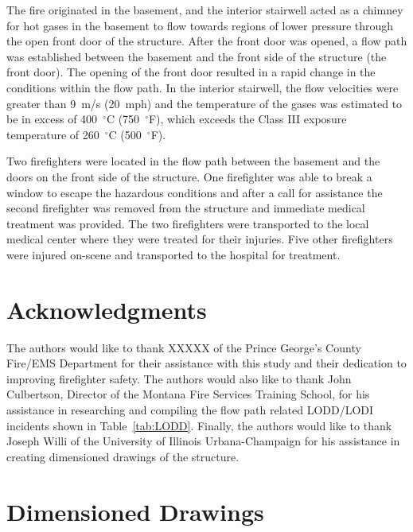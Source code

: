 \documentclass[12pt,oneside]{book}
\begin{document}
The fire originated in the basement, and the interior stairwell acted as a chimney for hot gases in the basement to flow towards regions of lower pressure through the open front door of the structure. After the front door was opened, a flow path was established between the basement and the front side of the structure (the front door). The opening of the front door resulted in a rapid change in the conditions within the flow path. In the interior stairwell, the flow velocities were greater than 9~m/s (20~mph) and the temperature of the gases was estimated to be in excess of 400~$^{\circ}$C (750~$^{\circ}$F), which exceeds the Class III exposure temperature of 260~$^{\circ}$C (500~$^{\circ}$F).

Two firefighters were located in the flow path between the basement and the doors on the front side of the structure. One firefighter was able to break a window to escape the hazardous conditions and after a call for assistance the second firefighter was removed from the structure and immediate medical treatment was provided. The two firefighters were transported to the local medical center where they were treated for their injuries. Five other firefighters were injured on-scene and transported to the hospital for treatment.

\chapter{Acknowledgments}

The authors would like to thank XXXXX of the Prince George's County Fire/EMS Department for their assistance with this study and their dedication to improving firefighter safety. The authors would also like to thank John Culbertson, Director of the Montana Fire Services Training School, for his assistance in researching and compiling the flow path related LODD/LODI incidents shown in Table~\ref{tab:LODD}. Finally, the authors would like to thank Joseph Willi of the University of Illinois Urbana-Champaign for his assistance in creating dimensioned drawings of the structure.




\appendix

\chapter{Dimensioned Drawings}
\label{app_draw}
\end{document}

